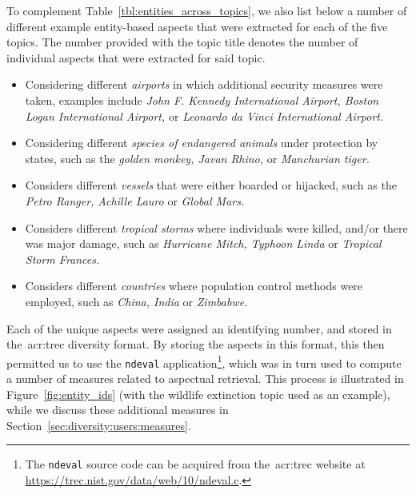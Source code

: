 To complement Table~\ref{tbl:entities_across_topics}, we also list below a number of different example entity-based aspects that were extracted for each of the five topics. The number provided with the topic title denotes the number of individual aspects that were extracted for said topic.

\begin{itemize}
    \item{ Considering different \emph{airports} in which additional security measures were taken, examples include \emph{John F. Kennedy International Airport, Boston Logan International Airport,} or \emph{Leonardo da Vinci International Airport.}}
    \item{ Considering different \emph{species of endangered animals} under protection by states, such as the \emph{golden monkey, Javan Rhino,} or \emph{Manchurian tiger.}}
    \item{ Considers different \emph{vessels} that were either boarded or hijacked, such as the \emph{Petro Ranger, Achille Lauro} or \emph{Global Mars.}}
    \item{ Considers different \emph{tropical storms} where individuals were killed, and/or there was major damage, such as \emph{Hurricane Mitch, Typhoon Linda} or \emph{Tropical Storm Frances.}}
    \item{ Considers different \emph{countries} where population control methods were employed, such as \emph{China, India} or \emph{Zimbabwe.}}
\end{itemize}

Each of the unique aspects were assigned an identifying number, and stored in the~\gls{acr:trec} diversity format. By storing the aspects in this format, this then permitted us to use the \texttt{ndeval} application\footnote{The \texttt{ndeval} source code can be acquired from the~\gls{acr:trec} website at \url{https://trec.nist.gov/data/web/10/ndeval.c}. }, which was in turn used to compute a number of measures related to aspectual retrieval. This process is illustrated in Figure~\ref{fig:entity_ids} (with the wildlife extinction topic used as an example), while we discuss these additional measures in Section~\ref{sec:diversity:users:measures}.

